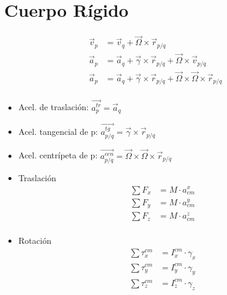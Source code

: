 \section{Cuerpo Rígido}

     \begin{equation}
     \begin{split}
        \Vec{v}_p &= \Vec{v}_q + \Vec{\Omega} \times \Vec{r}_{p/q}\\
        \Vec{a}_p &= \Vec{a}_q + \Vec{\gamma} \times \Vec{r}_{p/q} + \Vec{\Omega} \times \Vec{v}_{p/q}\\
        \Vec{a}_p &= \Vec{a}_q + \Vec{\gamma} \times \Vec{r}_{p/q} + \Vec{\Omega} \times \vec{\Omega} \times \Vec{r}_{p/q}\\
     \end{split}
     \end{equation}
     \begin{itemize}
         \item Acel. de traslación: \hspace{1cm}$\overrightarrow{a_{p}^{tr}} = \Vec{a}_q$
         \item Acel. tangencial de p: \hspace{0.5cm}$\overrightarrow{a_{p/q}^{tg}} = \Vec{\gamma} \times \Vec{r}_{p/q}$
         \item Acel. centrípeta de p: \hspace{0.5cm}$\overrightarrow{a_{p/q}^{cen}} = \Vec{\Omega} \times \vec{\Omega} \times \Vec{r}_{p/q}$
     \end{itemize}
  
 \begin{itemize}
     \item Traslación
     \begin{equation}
         \begin{split}
            \sum F_x &= M \cdot a_{cm}^x\\
            \sum F_y &= M \cdot a_{cm}^y\\
            \sum F_z &= M \cdot a_{cm}^z\\
         \end{split}
     \end{equation}
     \item Rotación
     \begin{equation}
         \begin{split}
            \sum \tau_{x}^{cm} &= I_{x}^{cm} \cdot \gamma_{x}\\
            \sum \tau_{y}^{cm} &= I_{y}^{cm} \cdot \gamma_{y}\\
            \sum \tau_{z}^{cm} &= I_{z}^{cm} \cdot \gamma_{z}\\
         \end{split}
     \end{equation}
 \end{itemize}

